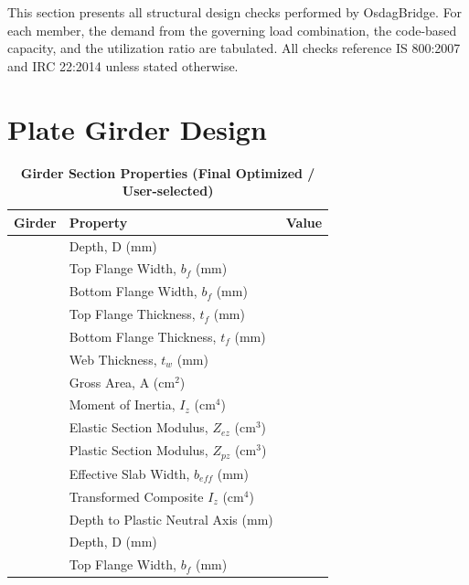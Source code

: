 \documentclass[12pt,a4paper]{report}
\numberwithin{table}{chapter}
\numberwithin{figure}{chapter}
\begin{document}
This section presents all structural design checks performed by OsdagBridge. For each member, the demand from the governing load combination, the code-based capacity, and the utilization ratio are tabulated. All checks reference IS 800:2007 and IRC 22:2014 unless stated otherwise.

\section{Plate Girder Design}
\label{sec:plate-girder}

\vspace{1em}
\begin{longtable}{|C{2.5cm}|L{8.0cm}|>{\centering\arraybackslash}p{5.0cm}|}
\caption{\textbf{Girder Section Properties (Final Optimized / User-selected)}}
\hline
\textbf{Girder} & \textbf{Property} & \textbf{Value} \\[6pt]
\hline
{} & \textnormal{Depth, D (mm)} &  \\[6pt]
 & \textnormal{Top Flange Width, $b_f$ (mm)} &  \\[6pt]
 & \textnormal{Bottom Flange Width, $b_f$ (mm)} &  \\[6pt]
 & \textnormal{Top Flange Thickness, $t_f$ (mm)} &  \\[6pt]
 & \textnormal{Bottom Flange Thickness, $t_f$ (mm)} &  \\[6pt]
 & \textnormal{Web Thickness, $t_w$ (mm)} &  \\[6pt]
 & \textnormal{Gross Area, A (cm$^2$)} &  \\[6pt]
 & \textnormal{Moment of Inertia, $I_z$ (cm$^4$)} &  \\[6pt]
 & \textnormal{Elastic Section Modulus, $Z_{ez}$ (cm$^3$)} &  \\[6pt]
 & \textnormal{Plastic Section Modulus, $Z_{pz}$ (cm$^3$)} &  \\[6pt]
 & \textnormal{Effective Slab Width, $b_{eff}$ (mm)} &  \\[6pt]
 & \textnormal{Transformed Composite $I_z$ (cm$^4$)} &  \\[6pt]
 & \textnormal{Depth to Plastic Neutral Axis (mm)} &  \\[6pt]
\hline
{} & \textnormal{Depth, D (mm)} &  \\[6pt]
 & \textnormal{Top Flange Width, $b_f$ (mm)} &  \\[6pt]

\end{longtable}
\end{document}
